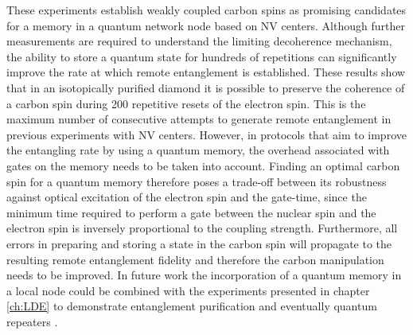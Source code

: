 These experiments establish weakly coupled carbon spins as promising candidates for a memory in a quantum network node based on NV centers. Although further measurements are required to understand the limiting decoherence mechanism, the ability to store a quantum state for hundreds of repetitions can significantly improve the rate at which remote entanglement is established. These results show that in an isotopically purified diamond it is possible to preserve the coherence of a carbon spin during 200 repetitive resets of the electron spin. This is the maximum number of consecutive attempts to generate remote entanglement in previous experiments with NV centers\cite{Bernien_Nature_2013,Pfaff_Science_2014}. However, in protocols that aim to improve the entangling rate by using a quantum memory, the overhead associated with gates on the memory needs to be taken into account. Finding an optimal carbon spin for a quantum memory therefore poses a trade-off between its robustness against optical excitation of the electron spin and the gate-time, since the minimum time required to perform a gate between the nuclear spin and the electron spin is inversely proportional to the coupling strength. Furthermore, all errors in preparing and storing a state in the carbon spin will propagate to the resulting remote entanglement fidelity and therefore the carbon manipulation needs to be improved. In future work the incorporation of a quantum memory in a local node could be combined with the experiments presented in chapter \ref{ch:LDE} to demonstrate entanglement purification\cite{Campbell_Phys.Rev.Lett._2008} and eventually quantum repeaters \cite{Briegel_Phys.Rev.Lett._1998}.

\clearpage




